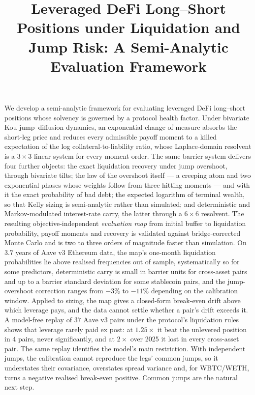 \documentclass[11pt]{article}
\makeatletter
\renewcommand{\maketitle}{%
  \clearpage\null
  \vspace*{42pt}%
  \begin{center}
    {\fontsize{18}{22}\selectfont\bfseries\MakeUppercase{\@title}\par}%
    \ifx\@author\@empty\else
      \vskip 21pt
      {\fontsize{13}{15}\selectfont\@author\par}%
    \fi
  \end{center}
  \vskip 18pt
}
\renewenvironment{abstract}{%
  \fontsize{9}{11}\selectfont
  \setlength{\leftskip}{2pc}%
  \setlength{\rightskip}{2pc}%
  \noindent\ignorespaces
}{%
  \par\addvspace{32pt}%
}
\theoremstyle{plain}
\theoremstyle{definition}
\theoremstyle{remark}
\makeatother
\begin{document}
\title{Leveraged DeFi Long--Short Positions under Liquidation and Jump Risk: A Semi-Analytic Evaluation Framework}

\maketitle

\begin{abstract}
We develop a semi-analytic framework for evaluating leveraged DeFi long--short positions whose
solvency is governed by a protocol health factor. Under bivariate Kou jump--diffusion dynamics, an
exponential change of measure absorbs the short-leg price and reduces every admissible payoff moment
to a killed expectation of the log collateral-to-liability ratio, whose Laplace-domain resolvent is a
$3\times3$ linear system for every moment order. The same barrier system delivers four further
objects: the exact liquidation recovery under jump overshoot, through bivariate tilts; the law of the
overshoot itself --- a creeping atom and two exponential phases whose weights follow from three
hitting moments --- and with it the exact probability of bad debt; the expected logarithm of
terminal wealth, so that Kelly sizing is semi-analytic rather than simulated; and deterministic and
Markov-modulated interest-rate carry, the latter through a $6\times6$ resolvent. The resulting
objective-independent \emph{evaluation map} from initial buffer to liquidation probability, payoff
moments and recovery is validated against bridge-corrected Monte Carlo and is two to three orders
of magnitude faster than simulation. On $3.7$ years of Aave v3 Ethereum data, the map's one-month
liquidation probabilities lie above realised frequencies out of sample, systematically so for some
predictors, deterministic carry is small in barrier
units for cross-asset pairs and up to a barrier standard deviation for some stablecoin pairs, and the jump-overshoot correction ranges from $-3\%$
to $-11\%$ depending on the calibration window. Applied to sizing, the map gives a closed-form
break-even drift above which leverage pays, and the data cannot settle whether a pair's drift
exceeds it. A model-free replay of $37$ Aave v3 pairs under the protocol's liquidation rules shows
that leverage rarely paid ex post: at $1.25\times$ it beat the unlevered position in $4$ pairs, never
significantly, and at $2\times$ over 2025 it lost in every cross-asset pair. The same replay identifies the
model's main restriction. With independent jumps, the calibration cannot reproduce the legs' common
jumps, so it understates their covariance, overstates spread variance and, for WBTC/WETH, turns a
negative realised break-even positive. Common jumps are the natural next step.
\end{abstract}
\end{document}
